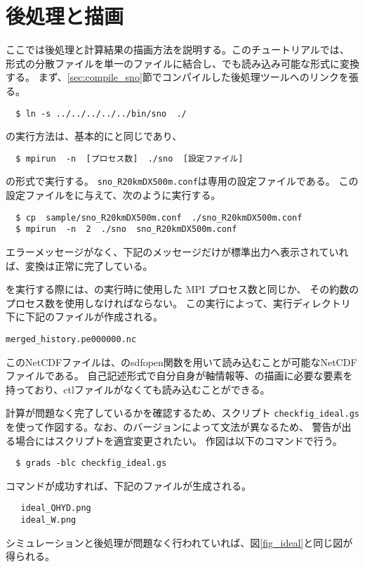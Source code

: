 \section{後処理と描画} \label{sec:ideal_exp_sno}
ここでは後処理と計算結果の描画方法を説明する。このチュートリアルでは、
{\netcdf}形式の分散ファイルを単一のファイルに結合し、\grads でも読み込み可能な{\netcdf}形式に変換する。
まず、\ref{sec:compile_sno}節でコンパイルした後処理ツール\sno へのリンクを張る。
\begin{verbatim}
  $ ln -s ../../../../../bin/sno  ./
\end{verbatim}

\sno の実行方法は、基本的に{\scalerm}と同じであり、
\begin{verbatim}
  $ mpirun  -n  [プロセス数]  ./sno  [設定ファイル]
\end{verbatim}
の形式で実行する。
\verb|sno_R20kmDX500m.conf|は\sno 専用の設定ファイルである。
この設定ファイルを\sno に与えて、次のように実行する。
\begin{verbatim}
  $ cp  sample/sno_R20kmDX500m.conf  ./sno_R20kmDX500m.conf
  $ mpirun  -n  2  ./sno  sno_R20kmDX500m.conf
\end{verbatim}
エラーメッセージがなく、下記のメッセージだけが標準出力へ表示されていれば、変換は正常に完了している。

\sno を実行する際には、{\scalerm}の実行時に使用した MPI プロセス数と同じか、
その約数のプロセス数を使用しなければならない。
この実行によって、実行ディレクトリ下に下記のファイルが作成される。
\begin{alltt}
  merged_history.pe000000.nc
\end{alltt}
このNetCDFファイルは、\grads のsdfopen関数を用いて読み込むことが可能なNetCDFファイルである。
自己記述形式で自分自身が軸情報等、\grads の描画に必要な要素を持っており、ctlファイルがなくても読み込むことができる。

計算が問題なく完了しているかを確認するため、\grads スクリプト \verb|checkfig_ideal.gs|
を使って作図する。なお、\grads のバージョンによって文法が異なるため、
警告が出る場合には\grads スクリプトを適宜変更されたい。
作図は以下のコマンドで行う。
\begin{verbatim}
  $ grads -blc checkfig_ideal.gs
\end{verbatim}
コマンドが成功すれば、下記のファイルが生成される。
\begin{verbatim}
   ideal_QHYD.png
   ideal_W.png
\end{verbatim}
シミュレーションと後処理が問題なく行われていれば、図\ref{fig_ideal}と同じ図が得られる。

